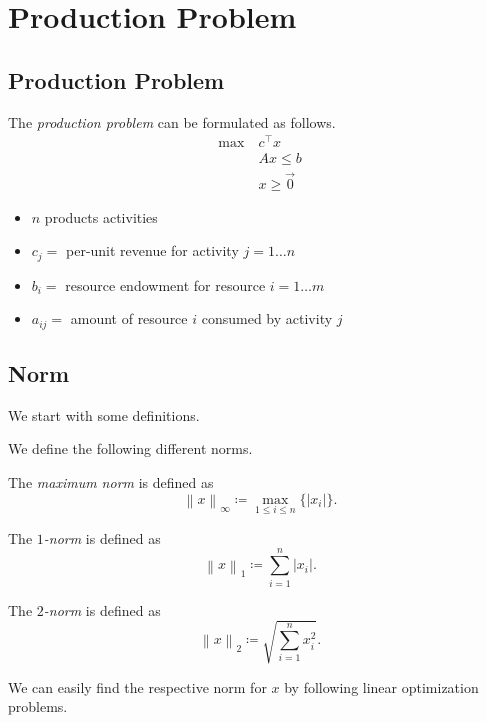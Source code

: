 \chapter{Production Problem}
\section{Production Problem}
The \emph{production problem} can be formulated as follows.
\[
	\begin{aligned}
		\max~ & c^{\top}x     \\
		      & Ax \leq b     \\
		      & x\geq \vec{0}
	\end{aligned}
\]
\begin{itemize}
	\item \(n\) products activities
	\item \(c_{j}=\) per-unit revenue for activity \(j = 1\ldots n\)
	\item \(b_{i}=\) resource endowment for resource \(i = 1\ldots m\)
	\item \(a_{ij}=\) amount of resource \(i\) consumed by activity \(j\)
\end{itemize}

\section{Norm}
We start with some definitions.
\begin{definition}
	We define the following different norms.
	\begin{definition}\label{def:maximum-norm}
		The \emph{maximum norm} is defined as
		\[
			\left\lVert x\right\rVert_{\infty } \coloneqq \max_{1\leq i \leq n}\{\left\vert x_i \right\vert \}.
		\]
	\end{definition}
	\begin{definition}[\(1\)-norm]\label{def:1-norm}
		The \emph{\(1\)-norm} is defined as
		\[
			\left\lVert x\right\rVert_{1} \coloneqq \sum\limits_{i=1}^{n} \left\vert x_i \right\vert.
		\]
	\end{definition}
	\begin{definition}[\(2\)-norm]\label{def:2-norm}
		The \emph{\(2\)-norm} is defined as
		\[
			\left\lVert x\right\rVert_{2} \coloneqq \sqrt{\sum\limits_{i=1}^{n} x_i^2}.
		\]
	\end{definition}
\end{definition}

We can easily find the respective norm for \(x\) by following linear optimization problems.

